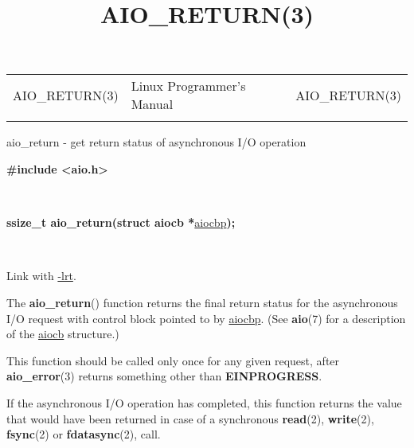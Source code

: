 \documentclass[]{article}
\title{AIO\_RETURN(3)}
\author{}
\date{}
\let\realtextbf=\textbf
\renewcommand{\textbf}[1]{\textcolor{boldcolor}{\realtextbf{#1}}}
\renewcommand{\emph}[1]{\underline{#1}}
\begin{document}
\maketitle

\begin{longtable}[c]{@{}lll@{}}
\toprule\addlinespace
AIO\_RETURN(3) & Linux Programmer's Manual & AIO\_RETURN(3)
\\\addlinespace
\bottomrule
\end{longtable}


aio\_return - get return status of asynchronous I/O operation


\textbf{\#include \textless{}aio.h\textgreater{}}

~

\textbf{ssize\_t aio\_return(struct aiocb *}\emph{aiocbp}\textbf{);}

~

Link with \emph{-lrt}.


The \textbf{aio\_return}() function returns the final return status for
the asynchronous I/O request with control block pointed to by
\emph{aiocbp}. (See \textbf{aio}(7) for a description of the
\emph{aiocb} structure.)

This function should be called only once for any given request, after
\textbf{aio\_error}(3) returns something other than
\textbf{EINPROGRESS}.


If the asynchronous I/O operation has completed, this function returns
the value that would have been returned in case of a synchronous
\textbf{read}(2), \textbf{write}(2), \textbf{fsync}(2) or
\textbf{fdatasync}(2), call.
\end{document}
